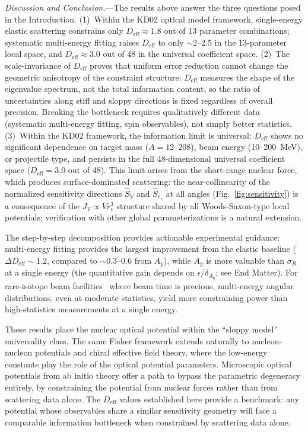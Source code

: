 \documentclass[aps,prl,reprint,superscriptaddress,showpacs]{revtex4-2}
\begin{document}
\textit{Discussion and Conclusion.}---The results above answer the three questions posed in the Introduction. (1)~Within the KD02 optical model framework, single-energy elastic scattering constrains only $D_\mathrm{eff} \approx 1.8$ out of 13 parameter combinations; systematic multi-energy fitting raises $D_\mathrm{eff}$ to only $\sim$2--2.5 in the 13-parameter local space, and $D_\mathrm{eff} \approx 3.0$ out of 48 in the universal coefficient space. (2)~The scale-invariance of $D_\mathrm{eff}$ proves that uniform error reduction cannot change the geometric anisotropy of the constraint structure: $D_\mathrm{eff}$ measures the shape of the eigenvalue spectrum, not the total information content, so the ratio of uncertainties along stiff and sloppy directions is fixed regardless of overall precision. Breaking the bottleneck requires qualitatively different data (systematic multi-energy fitting, spin observables), not simply better statistics. (3)~Within the KD02 framework, the information limit is universal: $D_\mathrm{eff}$ shows no significant dependence on target mass ($A = 12$--$208$), beam energy (10--200~MeV), or projectile type, and persists in the full 48-dimensional universal coefficient space ($D_\mathrm{eff} = 3.0$ out of 48). This limit arises from the short-range nuclear force, which produces surface-dominated scattering: the near-collinearity of the normalized sensitivity directions $\hat{S}_V$ and $\hat{S}_{r_v}$ at all angles (Fig.~\ref{fig:sensitivity}) is a consequence of the $J_V \propto V r_v^3$ structure shared by all Woods-Saxon-type local potentials; verification with other global parameterizations is a natural extension.

The step-by-step decomposition provides actionable experimental guidance: multi-energy fitting provides the largest improvement from the elastic baseline ($\Delta D_\mathrm{eff} \sim 1.2$, compared to $\sim$0.3--0.6 from $A_y$), while $A_y$ is more valuable than $\sigma_R$ at a single energy (the quantitative gain depends on $\epsilon/\delta_{A_y}$; see End Matter). For rare-isotope beam facilities~\cite{Hebborn2023,Hebborn2023PRL} where beam time is precious, multi-energy angular distributions, even at moderate statistics, yield more constraining power than high-statistics measurements at a single energy.

These results place the nuclear optical potential within the ``sloppy model'' universality class. The same Fisher framework extends naturally to nucleon-nucleon potentials and chiral effective field theory, where the low-energy constants play the role of the optical potential parameters. Microscopic optical potentials from ab initio theory offer a path to bypass the parametric degeneracy entirely, by constraining the potential from nuclear forces rather than from scattering data alone. The $D_\mathrm{eff}$ values established here provide a benchmark: any potential whose observables share a similar sensitivity geometry will face a comparable information bottleneck when constrained by scattering data alone.
\end{document}
